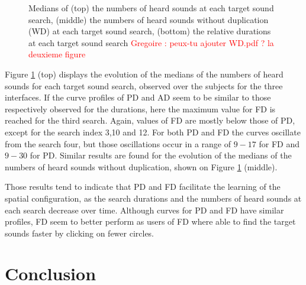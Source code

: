 \documentclass{aes2e}
\newcommand{\gregoire}[1]{\textcolor{red}{Gregoire : #1}}
\begin{document}
\begin{figure}[t!]
\begin{tabular}{c}
\end{tabular}
\caption{\label{fig1PR} Medians of (top) the numbers of heard sounds at each target sound search, (middle) the numbers of heard sounds without duplication (WD) at each target sound search, (bottom) the relative durations at each target sound search \gregoire{peux-tu ajouter WD.pdf ? la deuxieme figure}}
\end{figure}
Figure \ref{fig1PR} (top) displays the evolution of the medians of the numbers of heard sounds for each target sound search, observed over the subjects for the three interfaces. If the curve profiles of PD and AD seem to be similar to those respectively observed for the durations, here the maximum value for FD  is reached for the third search. Again, values of FD are mostly below those of PD, except for the search index 3,10 and 12. For both PD and FD the curves oscillate from the search four, but those oscillations occur in a range of $9-17$ for FD and  $9-30$ for PD. Similar results are found for the evolution of the medians of the numbers of heard sounds without duplication, shown on Figure \ref{fig1PR} (middle).

Those results tend to indicate that PD and FD facilitate the learning of the spatial configuration, as the search durations and the numbers of heard sounds at each search decrease over time. Although curves for PD and FD have similar profiles, FD seem to better perform as users of FD where able to find the target sounds faster by clicking on fewer circles.

\section{Conclusion}
\end{document}
